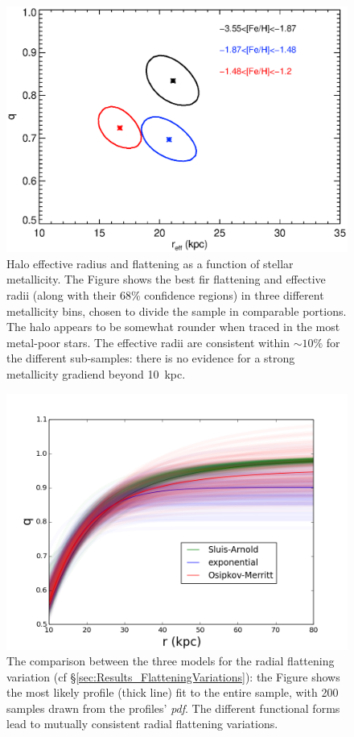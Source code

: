 \documentclass[12pt,preprint]{aastex}
\begin{document}
\begin{figure}[htbp]
\centering
\includegraphics[width=\textwidth]{doublehp_reffqfehbin_Nov12014_einasto_pts96_fixn_contour}
\caption{Halo effective radius and flattening as a function of stellar metallicity. The Figure shows the best fir flattening and effective radii  (along with their 68\% confidence regions) in three different metallicity bins, chosen to divide the sample in comparable portions. The halo appears to be somewhat rounder when traced in the most metal-poor stars. The effective radii are consistent within $\sim 10\%$ for the 
different sub-samples: there is no evidence for a strong metallicity gradiend beyond 10~kpc.}

\label{f:ffehdependence}
\end{figure}
\begin{figure}[htbp]
\centering
\includegraphics[width=\textwidth]{q_variation}
\caption{The comparison between the three models for the radial flattening variation (cf \S \ref{sec:Results_FlatteningVariations}): the Figure shows the most likely profile (thick line) fit to the entire sample, with 200 samples drawn from the profiles' {\it pdf}. The different functional forms lead to mutually consistent radial flattening variations.}
\label{f:fqv}
\end{figure}
\end{document}
